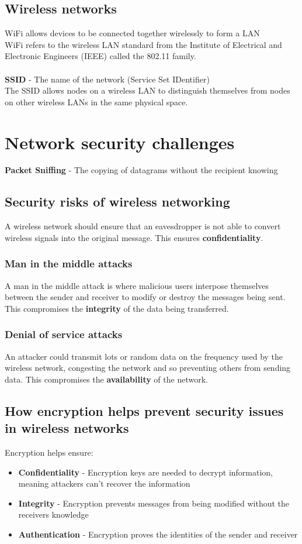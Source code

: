 \documentclass{article}[18pt]
\begin{document}
\subsection{Wireless networks}
WiFi allows devices to be connected together wirelessly to form a LAN\\
WiFi refers to the wireless LAN standard from the Institute of Electrical and Electronic Engineers (IEEE) called the 802.11 family.\\
\\
\textbf{SSID} - The name of the network (Service Set IDentifier)\\
The SSID allows nodes on a wireless LAN to distinguish themselves from nodes on other wireless LANs in the same physical space.
\section{Network security challenges}
\textbf{Packet Sniffing} - The copying of datagrams without the recipient knowing
\subsection{Security risks of wireless networking}
A wireless network should ensure that an eavesdropper is not able to convert wireless signals into the original message. This ensures \textbf{confidentiality}.
\subsubsection{Man in the middle attacks}
A man in the middle attack is where malicious users interpose themselves between the sender and receiver to modify or destroy the messages being sent. This compromises the \textbf{integrity} of the data being transferred.
\subsubsection{Denial of service attacks}
An attacker could transmit lots or random data on the frequency used by the wireless network, congesting the network and so preventing others from sending data. This compromises the \textbf{availability} of the network.
\newpage
\subsection{How encryption helps prevent security issues in wireless networks}
Encryption helps ensure:
\begin{itemize}
\item \textbf{Confidentiality} - Encryption keys are needed to decrypt information, meaning attackers can't recover the information
\item \textbf{Integrity} - Encryption prevents messages from being modified without the receivers knowledge
\item \textbf{Authentication} - Encryption proves the identities of the sender and receiver
\end{itemize}
\end{document}
